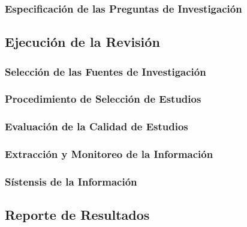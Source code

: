 \documentclass{beamer}
\begin{document}
\subsubsection{Especificación de las Preguntas de Investigación} %

\subsection{Ejecución de la Revisión} %

\subsubsection{Selección de las Fuentes de Investigación} %

\subsubsection{Procedimiento de Selección de Estudios} %

\subsubsection{Evaluación de la Calidad de Estudios} %

\subsubsection{Extracción y Monitoreo de la Información} %

\subsubsection{Sístensis de la Información} %

\subsection{Reporte de Resultados} %
\end{document}
